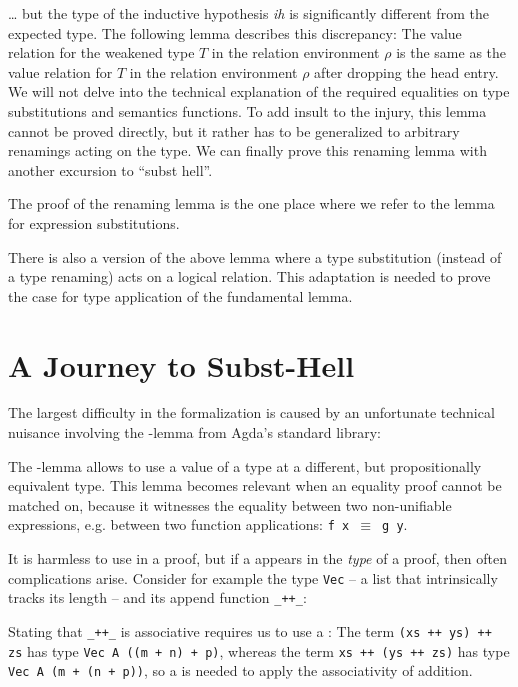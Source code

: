 \documentclass[acmsmall,anonymous,review,screen]{acmart}
\begin{document}
{\dots} but the type of the inductive hypothesis \textit{ih} is
significantly different from the expected type.
The following lemma describes this discrepancy: The value relation for
the weakened type $T$ in the relation environment $\rho$ is the same
as the value relation for $T$ in the relation environment $\rho$ after
dropping the head entry. We will not delve into the technical
explanation of the required equalities on type substitutions and
semantics functions.
\LRVrenLRVwk
To add insult to the injury, this lemma cannot be proved directly, but
it rather has to be generalized to arbitrary renamings acting on the
type.
We can finally prove this renaming lemma with another excursion to
``subst hell''.
\LRVrenLRVrenEqType

The proof of the renaming lemma is the one place where we refer to the
lemma {\AFusionESubESub} for expression substitutions.

There is also a version {\ALRVsub} of the above lemma where a type substitution
(instead of a type renaming) acts on a logical relation. This
adaptation is needed to prove the case for type application of the
fundamental lemma.

\section{A Journey to Subst-Hell}
\label{sec:subst-hell}

The largest difficulty in the formalization is caused by an unfortunate
technical nuisance involving the {\Asubst}-lemma from Agda's standard library:

\SubstExamplesDef

The {\Asubst}-lemma allows to use a value of a type at a different,
but propositionally equivalent type.
This lemma becomes relevant when an equality proof cannot be matched
on, because it witnesses the equality between two non-unifiable
expressions, e.g. between two function applications: \texttt{f x $\equiv$ g y}.

It is harmless to use {\Asubst} in a proof, but if a {\Asubst} appears
in the \emph{type} of a proof, then often complications arise.
Consider for example the type \texttt{Vec} -- a list that
intrinsically tracks its length -- and its append function \verb/_++_/:
\SubstExamplesVec
\SubstExamplesAppend

Stating that \verb/_++_/ is associative requires us to use a {\Asubst}:
\SubstExamplesAssocType
The term \texttt{(xs ++ ys) ++ zs} has type \texttt{Vec A ((m + n) + p)}, whereas
the term \texttt{xs ++ (ys ++ zs)} has type \texttt{Vec A (m + (n + p))}, so a
{\Asubst} is needed to apply the associativity of addition.
\end{document}

